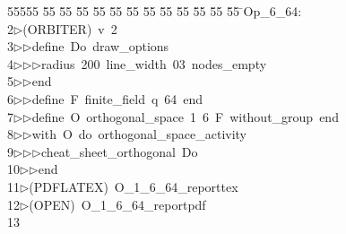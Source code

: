 %
%
\begin{tabbing}
55555 \= 55 \= 55 \= 55 \= 55 \= 55 \= 55 \= 55 \= 55 \= 55 \= 55 \= 55 \= 55 \= \>Op\_6\_64:\\[0pt]
2\>$\triangleright$\>(ORBITER)\ v\ 2\ \\[0pt]
3\>$\triangleright$\>$\triangleright$\>define\ Do\ draw\_options\ \\[0pt]
4\>$\triangleright$\>$\triangleright$\>$\triangleright$\>radius\ 200\ line\_width\ 03\ nodes\_empty\ \\[0pt]
5\>$\triangleright$\>$\triangleright$\>end\ \\[0pt]
6\>$\triangleright$\>$\triangleright$\>define\ F\ finite\_field\ q\ 64\ end\ \\[0pt]
7\>$\triangleright$\>$\triangleright$\>define\ O\ orthogonal\_space\ 1\ 6\ F\ without\_group\ end\ \\[0pt]
8\>$\triangleright$\>$\triangleright$\>with\ O\ do\ orthogonal\_space\_activity\ \\[0pt]
9\>$\triangleright$\>$\triangleright$\>$\triangleright$\>cheat\_sheet\_orthogonal\ Do\ \\[0pt]
10\>$\triangleright$\>$\triangleright$\>end\\[0pt]
11\>$\triangleright$\>(PDFLATEX)\ O\_1\_6\_64\_reporttex\ \\[0pt]
12\>$\triangleright$\>(OPEN)\ O\_1\_6\_64\_reportpdf\\[0pt]
13\>\end{tabbing}
